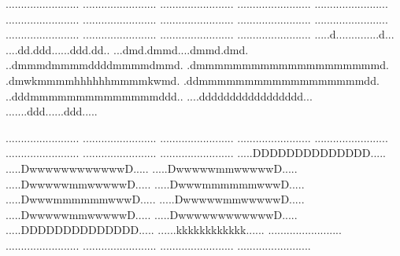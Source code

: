   {........................}
  {........................}
  {........................}
  {........................}
  {........................}
  {........................}
  {........................}
  {........................}
  {........................}
  {........................}
 {........................}
 {........................}
 {........................}
 {........................}
 {.....d..............d...}
 {....dd.ddd......ddd.dd..}
 {...dmd.dmmd....dmmd.dmd.}
 {..dmmmdmmmmddddmmmmdmmd.}
 {.dmmmmmmmmmmmmmmmmmmmmd.}
 {.dmwkmmmmhhhhhhmmmmkwmd.}
 {.ddmmmmmmmmmmmmmmmmmmdd.}
 {..dddmmmmmmmmmmmmmmddd..}
 {....ddddddddddddddddd...}
 {.......ddd......ddd.....}

  {........................}
  {........................}
  {........................}
  {........................}
  {........................}
  {........................}
  {........................}
  {........................}
  {.....DDDDDDDDDDDDDD.....}
  {.....DwwwwwwwwwwwwD.....}
 {.....DwwwwwmmwwwwwD.....}
 {.....DwwwwwmmwwwwwD.....}
 {.....DwwwmmmmmmwwwD.....}
 {.....DwwwmmmmmmwwwD.....}
 {.....DwwwwwmmwwwwwD.....}
 {.....DwwwwwmmwwwwwD.....}
 {.....DwwwwwwwwwwwwD.....}
 {.....DDDDDDDDDDDDDD.....}
 {......kkkkkkkkkkkk......}
 {........................}
 {........................}
 {........................}
 {........................}
 {........................}

